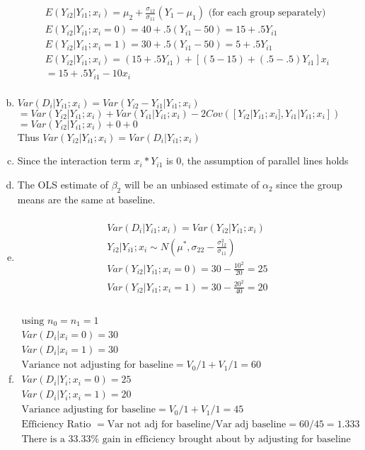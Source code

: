 \documentclass{article}
\newcommand{\sg}{\sigma}
\begin{document}
\begin{flushleft}
\begin{enumerate}[(a)]
\begin{multline*}
E(Y_{i2}|Y_{i1};x_i)=\mu_2+\frac{\sg_{12}}{\sg_{11}}(Y_1-\mu_1) \text{ (for each group separately)}\\
E(Y_{i2}|Y_{i1};x_i=0)=40+.5(Y_{i1}-50)=15+.5Y_{i1}\\
E(Y_{i2}|Y_{i1};x_i=1)=30+.5(Y_{i1}-50)=5+.5Y_{i1}\\
E(Y_{i2}|Y_{i1};x_i)=(15+.5Y_{i1})+[(5-15)+(.5-.5)Y_{i1}]x_i\\
=15+.5Y_{i1}-10x_i\\
\end{multline*}
\item
$Var(D_i|Y_{i1};x_i)=Var(Y_{i2}-Y_{i1}|Y_{i1};x_i)$\\
$=Var(Y_{i2}|Y_{i1};x_i)+Var(Y_{i1}|Y_{i1};x_i)-2Cov([Y_{i2}|Y_{i1};x_i],Y_{i1}|Y_{i1};x_i])$\\
$=Var(Y_{i2}|Y_{i1};x_i)+0+0$\\
Thus $Var(Y_{i2}|Y_{i1};x_i)=Var(D_i|Y_{i1};x_i)$
\item
Since the interaction term $x_i*Y_{i1}$ is 0, the assumption of parallel lines holds
\item
The OLS estimate of $\beta_2$ will be an unbiased estimate of $\alpha_2$ since the group means are the same at baseline. 
\item
\begin{multline*}\\
Var(D_i|Y_{i1};x_i)=Var(Y_{i2}|Y_{i1};x_i)\\
Y_{i2}|Y_{i1};x_i\sim N(\mu^*,\sg_{22}-\frac{\sg_{12}^2}{\sg_{11}})\\
Var(Y_{i2}|Y_{i1};x_i=0)=30-\frac{10^2}{20}=25\\
Var(Y_{i2}|Y_{i1};x_i=1)=30-\frac{20^2}{40}=20\\
\end{multline*}
\item
\begin{multline*}\\
\text{using } n_0=n_1=1\\
Var(D_i|x_i=0)=30\\
Var(D_i|x_i=1)=30\\
\text{Variance not adjusting for baseline}=V_0/1+V_1/1=60\\
Var(D_i|Y_i;x_i=0)=25\\
Var(D_i|Y_i;x_i=1)=20\\
\text{Variance adjusting for baseline}=V_0/1+V_1/1=45\\
\text{Efficiency Ratio }=\text{Var not adj for baseline}/\text{Var adj baseline}=60/45=1.333\\
\text{There is a } 33.33\% \text{ gain in efficiency brought about by adjusting for baseline}\\
\end{multline*}
\end{enumerate}

\end{flushleft}
\end{document}
